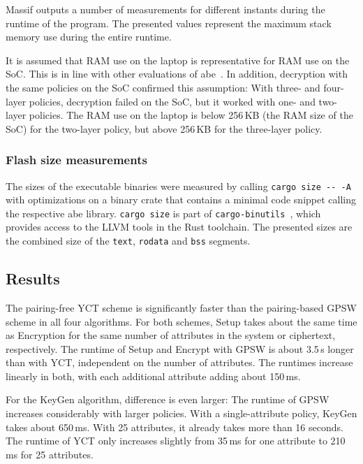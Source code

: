 Massif outputs a number of measurements for different instants during the runtime of the program. 
The presented values represent the maximum stack memory use during the entire runtime.

It is assumed that RAM use on the laptop is representative for RAM use on the SoC.
This is in line with other evaluations of \acrshort{abe}~\cite{borgh_attribute-based_2016}. 
In addition, decryption with the same policies on the SoC confirmed this assumption:
With three- and four-layer policies, decryption failed on the SoC, but it worked with one- and two-layer policies.
The RAM use on the laptop is below 256\,KB (the RAM size of the SoC) for the two-layer policy, but above 256\,KB for the three-layer policy.

\subsubsection{Flash size measurements}


The sizes of the executable binaries were measured by calling \verb+cargo size -- -A+ with optimizations on a binary crate that contains a minimal code snippet calling the respective \acrshort{abe} library.
\verb+cargo size+ is part of \verb+cargo-binutils+~\cite{noauthor_cargo-binutils_nodate}, which provides access to the LLVM tools in the Rust toolchain.
The presented sizes are the combined size of the \texttt{text}, \texttt{rodata} and \texttt{bss} segments.


\subsection{Results}
The pairing-free YCT scheme is significantly faster than the pairing-based GPSW scheme in all four algorithms. 
For both schemes, Setup takes about the same time as Encryption for the same number of attributes in the system or ciphertext, respectively.
The runtime of Setup and Encrypt with GPSW is about 3.5\,s longer than with YCT, independent on the number of attributes.
The runtimes increase linearly in both, with each additional attribute adding about 150\,ms.

For the KeyGen algorithm, difference is even larger:
The runtime of GPSW increases considerably with larger policies.
With a single-attribute policy, KeyGen takes about 650\,ms. With 25 attributes, it already takes more than 16 seconds.
The runtime of YCT only increases slightly from 35\,ms for one attribute to 210\,ms for 25 attributes.

